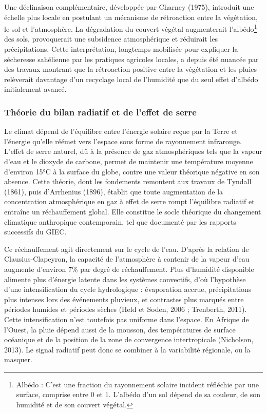 Une déclinaison complémentaire, développée par Charney (1975), introduit une échelle plus locale en postulant un mécanisme de rétroaction entre la végétation, le sol et l'atmosphère. La dégradation du couvert végétal augmenterait l'albédo\footnote{Albédo : C'est une fraction du rayonnement solaire incident réfléchie par une surface, comprise entre 0 et 1. L’albédo d’un sol dépend de sa couleur, de son humidité et de son couvert végétal.} des sols, provoquerait une subsidence atmosphérique et réduirait les précipitations. Cette interprétation, longtemps mobilisée pour expliquer la sécheresse sahélienne par les pratiques agricoles locales, a depuis été nuancée par des travaux montrant que la rétroaction positive entre la végétation et les pluies relèverait davantage d'un recyclage local de l'humidité que du seul effet d'albédo initialement avancé.

\subsubsection{Théorie du bilan radiatif et de l'effet de serre}

Le climat dépend de l'équilibre entre l'énergie solaire reçue par la Terre et l'énergie qu'elle réémet vers l'espace sous forme de rayonnement infrarouge. L'effet de serre naturel, dû à la présence de gaz atmosphériques tels que la vapeur d'eau et le dioxyde de carbone, permet de maintenir une température moyenne d'environ 15°C à la surface du globe, contre une valeur théorique négative en son absence. Cette théorie, dont les fondements remontent aux travaux de Tyndall (1861), puis d'Arrhenius (1896), établit que toute augmentation de la concentration atmosphérique en gaz à effet de serre rompt l'équilibre radiatif et entraîne un réchauffement global. Elle constitue le socle théorique du changement climatique anthropique contemporain, tel que documenté par les rapports successifs du GIEC.

Ce réchauffement agit directement sur le cycle de l'eau. D'après la relation de Clausius-Clapeyron, la capacité de l'atmosphère à contenir de la vapeur d'eau augmente d'environ 7\% par degré de réchauffement. Plus d'humidité disponible alimente plus d'énergie latente dans les systèmes convectifs, d'où l'hypothèse d'une intensification du cycle hydrologique : évaporation accrue, précipitations plus intenses lors des événements pluvieux, et contrastes plus marqués entre périodes humides et périodes sèches (Held et Soden, 2006 ; Trenberth, 2011). Cette intensification n'est toutefois pas uniforme dans l'espace. En Afrique de l'Ouest, la pluie dépend aussi de la mousson, des températures de surface océanique et de la position de la zone de convergence intertropicale (Nicholson, 2013). Le signal radiatif peut donc se combiner à la variabilité régionale, ou la masquer.

